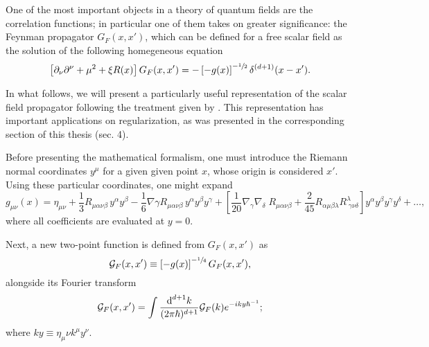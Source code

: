One of the most important objects in a theory of quantum fields are the correlation functions; in particular one of them takes on greater significance: the Feynman propagator $G_F(x,x')$, which can be defined for a free scalar field as the solution of the following homegeneous equation
\begin{equation}
	\left[\partial_\nu\partial^\nu+\mu^2+\xi R(x)\right]G_F(x,x')=-\left[-g(x)\right]^{-\sfrac{1}{2}}\delta^{(d+1)}(x-x').
\end{equation}

In what follows, we will present a particularly useful representation of the scalar field propagator following the treatment given by \cite{DeWitt}. This representation has important applications on regularization, as was presented in the corresponding section of this thesis (sec. 4). 

Before presenting the mathematical formalism, one must introduce the Riemann normal coordinates $y^\mu$ for a given given point $x$, whose origin is considered $x'$. Using these particular coordinates, one might expand
\begin{equation}\label{eq: Metric in Riemann coordinates}
	g_{\mu\nu}(x)=\eta_{\mu\nu}+\frac{1}{3}R_{\mu\alpha\nu\beta}\,y^\alpha y^\beta-\frac{1}{6}\nabla\gamma R_{\mu\alpha\nu\beta}\,y^\alpha y^\beta y^\gamma+\left[\frac{1}{20}\nabla_\gamma\nabla_\delta\; R_{\mu\alpha\nu\beta}+\frac{2}{45}R_{\alpha\mu\beta\lambda}R^\lambda_{\;\gamma\nu\delta}\right]y^\alpha y^\beta y^\gamma y^\delta+\hdots,
\end{equation}
where all coefficients are evaluated at $y=0$.

Next, a new two-point function is defined from $G_F(x,x')$ as
\begin{equation}
	\mathcal{G}_F(x,x')\equiv \left[-g(x)\right]^{-\sfrac{1}{4}}G_F(x,x'),
\end{equation}
alongside its Fourier transform
\begin{equation}
	\mathcal{G}_F(x,x')=\int \frac{\text{d}^{d+1}k}{(2\pi\hbar)^{d+1}}\mathcal{G}_F(k)e^{-iky\hbar^{-1}};
\end{equation}
where $ky\equiv \eta_\mu\nu k^\mu y^\nu$. 


